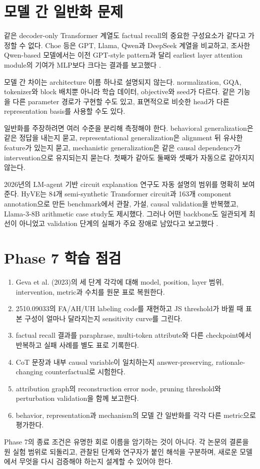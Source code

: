\section{모델 간 일반화 문제}

같은 decoder-only Transformer 계열도 factual recall의 중요한 구성요소가 같다고 가정할 수 없다.
Choe 등은 GPT, Llama, Qwen과 DeepSeek 계열을 비교하고, 조사한 Qwen-based 모델에서는 이전 GPT-style pattern과 달리 earliest layer attention module의 기여가 MLP보다 크다는 결과를 보고했다 \citep{choe2025crossarchitecture}.

모델 간 차이는 architecture 이름 하나로 설명되지 않는다.
normalization, GQA, tokenizer와 block 배치뿐 아니라 학습 데이터, objective와 seed가 다르다.
같은 기능을 다른 parameter 경로가 구현할 수도 있고, 표면적으로 비슷한 head가 다른 representation basis를 사용할 수도 있다.

일반화를 주장하려면 여러 수준을 분리해 측정해야 한다.
behavioral generalization은 같은 정답을 내는지 묻고, representational generalization은 alignment 뒤 유사한 feature가 있는지 묻고, mechanistic generalization은 같은 causal dependency가 intervention으로 유지되는지 묻는다.
첫째가 같아도 둘째와 셋째가 자동으로 같아지지 않는다.

2026년의 LM-agent 기반 circuit explanation 연구도 자동 설명의 범위를 명확히 보여준다.
HyVE는 84개 semi-synthetic Transformer circuit과 163개 component annotation으로 만든 benchmark에서 관찰, 가설, causal validation을 반복했고, Llama-3-8B arithmetic case study도 제시했다.
그러나 어떤 backbone도 일관되게 최선이 아니었고 validation 단계의 실패가 주요 장애로 남았다고 보고했다 \citep{khan2026agents}.

\section{Phase 7 학습 점검}

\begin{studybox}
\begin{enumerate}
  \item Geva et al. (2023)의 세 단계 각각에 대해 model, position, layer 범위, intervention, metric과 수치를 원문 표로 복원한다.
  \item 2510.09033의 FA/AH/UH labeling code를 재현하고 JS threshold가 바뀔 때 표본 구성이 얼마나 달라지는지 sensitivity curve를 그린다.
  \item factual recall 결과를 paraphrase, multi-token attribute와 다른 checkpoint에서 반복하고 실패 사례를 별도 표로 기록한다.
  \item CoT 문장과 내부 causal variable이 일치하는지 answer-preserving, rationale-changing counterfactual로 시험한다.
  \item attribution graph의 reconstruction error node, pruning threshold와 perturbation validation을 함께 보고한다.
  \item behavior, representation과 mechanism의 모델 간 일반화를 각각 다른 metric으로 평가한다.
\end{enumerate}
\end{studybox}

\begin{factbox}
Phase 7의 종료 조건은 유명한 회로 이름을 암기하는 것이 아니다.
각 논문의 결론을 원 실험 범위로 되돌리고, 관찰된 단계와 연구자가 붙인 해석을 구분하며, 새로운 모델에서 무엇을 다시 검증해야 하는지 설계할 수 있어야 한다.
\end{factbox}
